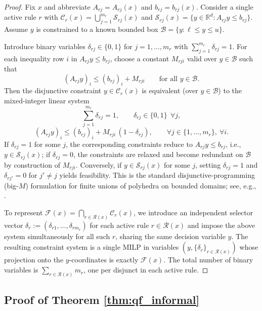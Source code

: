 \documentclass{article}
\theoremstyle{plain}
\theoremstyle{definition}
\theoremstyle{remark}
\begin{document}
\begin{proof}
Fix $x$ and abbreviate $A_{rj}=A_{rj}(x)$ and $b_{rj}=b_{rj}(x)$. Consider a single active rule $r$ with
\(
\mathcal{C}_r(x)=\bigcup_{j=1}^{m_r}\mathcal{S}_{rj}(x)
\)
and
\(
\mathcal{S}_{rj}(x)=\{y\in\mathbb{R}^d: A_{rj}y\le b_{rj}\}.
\)
Assume $y$ is constrained to a known bounded box $\mathcal{B}=\{y:\ell\le y\le u\}$.

Introduce binary variables $\delta_{rj}\in\{0,1\}$ for $j=1,\dots,m_r$ with $\sum_{j=1}^{m_r}\delta_{rj}=1$. For each inequality row $i$ in $A_{rj}y\le b_{rj}$, choose a constant $M_{rji}$ valid over $y\in\mathcal{B}$ such that
\[
(A_{rj}y)_i \le (b_{rj})_i + M_{rji}
\qquad\text{for all }y\in\mathcal{B}.
\]
Then the disjunctive constraint $y\in\mathcal{C}_r(x)$ is equivalent (over $y\in\mathcal{B}$) to the mixed-integer linear system
\[
\sum_{j=1}^{m_r}\delta_{rj}=1,\qquad \delta_{rj}\in\{0,1\}\ \ \forall j,
\]
\[
(A_{rj}y)_i \le (b_{rj})_i + M_{rji}\,(1-\delta_{rj}),
\qquad \forall j\in\{1,\dots,m_r\},\ \forall i.
\]
If $\delta_{rj}=1$ for some $j$, the corresponding constraints reduce to $A_{rj}y\le b_{rj}$, i.e., $y\in\mathcal{S}_{rj}(x)$; if $\delta_{rj}=0$, the constraints are relaxed and become redundant on $\mathcal{B}$ by construction of $M_{rji}$. Conversely, if $y\in\mathcal{S}_{rj}(x)$ for some $j$, setting $\delta_{rj}=1$ and $\delta_{rj'}=0$ for $j'\neq j$ yields feasibility. This is the standard disjunctive-programming (big-$M$) formulation for finite unions of polyhedra on bounded domains; see, e.g., \citet{balas2018disjunctive,JEROSLOW1987223}.

To represent $\mathcal{F}(x)=\bigcap_{r\in\mathcal{R}(x)}\mathcal{C}_r(x)$, we introduce an independent selector vector $\delta_r:=(\delta_{r1},\dots,\delta_{rm_r})$ for each active rule $r\in\mathcal{R}(x)$ and impose the above system simultaneously for all such $r$, sharing the same decision variable $y$. The resulting constraint system is a single MILP in variables $(y,\{\delta_r\}_{r\in\mathcal{R}(x)})$ whose projection onto the $y$-coordinates is exactly $\mathcal{F}(x)$. The total number of binary variables is $\sum_{r\in\mathcal{R}(x)} m_r$, one per disjunct in each active rule.
\end{proof}


\subsection{Proof of Theorem \ref{thm:qf_informal}}\label{app:qflraequiv}
\end{document}
